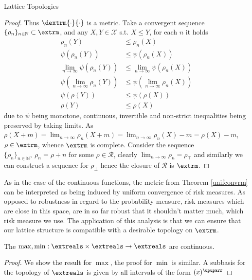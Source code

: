 \begin{subsection}{Lattice Topologies}
\begin{proof}
            Thus \( \dextrm{\cdot}{\cdot} \) is a metric.
            \newline
            Take a convergent sequence \( \{ \rho_n \}_{n \in \mathbb{N}} \subset \extrm \), 
            and any \( X, Y \in \mathcal{X} \) s.t. \( X \leq Y \), for each \( n \) it holds
            \begin{align*}
                \rho_n(Y) &\leq \rho_n(X) \\
                \psi(\rho_n(Y)) &\leq \psi(\rho_n(X)) \\
                \lim_{n \to \infty} \psi(\rho_n(Y)) &\leq \lim_{n \to \infty} \psi(\rho_n(X)) \\
                \psi(\lim_{n \to \infty} \rho_n(Y)) &\leq \psi(\lim_{n \to \infty} \rho_n(X)) \\
                \psi(\rho(Y)) &\leq \psi(\rho(X)) \\
                \rho(Y) &\leq \rho(X)
            \end{align*}
            due to \( \psi \) being monotone, continuous, invertible and non-strict inequalities being preserved by taking limits.
            As \( \rho(X + m) = \lim_{n \to \infty} \rho_n(X + m) = \lim_{n \to \infty} \rho_n(X) - m = \rho(X) - m \),
            \( \rho \in \extrm \), whence \( \extrm \) is complete.
            Consider the sequence \( \{ \rho_n \}_{n \in \mathbb{N}},\ \rho_n = \rho + n \) for some \( \rho \in \mathcal{R} \),
            clearly \( \lim_{n \to \infty} \rho_n = \rho_\top \) and similarly we can construct a sequence for \( \rho_\bot \)
            hence the closure of \( \mathcal{R} \) is \( \extrm \).
    \end{proof}
    As in the case of the continuous functions, the metric from Theorem \ref{unifconvrm} can be interpreted as being induced by uniform convergence
    of risk measures. As opposed to robustness in regard to the probability measure, risk measures which are close in this space, are in so far
    robust that it shouldn't matter much, which risk measure we use.
    The application of this analysis is that we can ensure that our lattice structure is compatible with a desirable topology 
    on \( \extrm \).
    \begin{lemma} \label{maxminarecont}
        The \( \max, \min : \extreals \times \extreals \to \extreals \) are continuous.
    \end{lemma}
    \begin{proof}
        We show the result for \( \max \), the proof for \( \min \) is similar.
        A subbasis for the topology of \( \extreals \) is given by all intervals of the form \( (x)^\upuparr \)

\end{proof}
\end{subsection}
